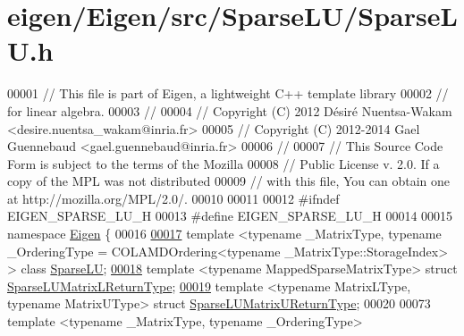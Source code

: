 \hypertarget{eigen_2_eigen_2src_2_sparse_l_u_2_sparse_l_u_8h_source}{}\section{eigen/\+Eigen/src/\+Sparse\+L\+U/\+Sparse\+LU.h}
\label{eigen_2_eigen_2src_2_sparse_l_u_2_sparse_l_u_8h_source}

\begin{DoxyCode}
00001 \textcolor{comment}{// This file is part of Eigen, a lightweight C++ template library}
00002 \textcolor{comment}{// for linear algebra.}
00003 \textcolor{comment}{//}
00004 \textcolor{comment}{// Copyright (C) 2012 Désiré Nuentsa-Wakam <desire.nuentsa\_wakam@inria.fr>}
00005 \textcolor{comment}{// Copyright (C) 2012-2014 Gael Guennebaud <gael.guennebaud@inria.fr>}
00006 \textcolor{comment}{//}
00007 \textcolor{comment}{// This Source Code Form is subject to the terms of the Mozilla}
00008 \textcolor{comment}{// Public License v. 2.0. If a copy of the MPL was not distributed}
00009 \textcolor{comment}{// with this file, You can obtain one at http://mozilla.org/MPL/2.0/.}
00010 
00011 
00012 \textcolor{preprocessor}{#ifndef EIGEN\_SPARSE\_LU\_H}
00013 \textcolor{preprocessor}{#define EIGEN\_SPARSE\_LU\_H}
00014 
00015 \textcolor{keyword}{namespace }\hyperlink{namespace_eigen}{Eigen} \{
00016 
\hyperlink{group___sparse_l_u___module}{00017} \textcolor{keyword}{template} <\textcolor{keyword}{typename} \_MatrixType, \textcolor{keyword}{typename} \_OrderingType = COLAMDOrdering<\textcolor{keyword}{typename} \_MatrixType::StorageIndex>
       > \textcolor{keyword}{class }\hyperlink{group___sparse_l_u___module_class_eigen_1_1_sparse_l_u}{SparseLU};
\hyperlink{struct_eigen_1_1_sparse_l_u_matrix_l_return_type}{00018} \textcolor{keyword}{template} <\textcolor{keyword}{typename} MappedSparseMatrixType> \textcolor{keyword}{struct }\hyperlink{struct_eigen_1_1_sparse_l_u_matrix_l_return_type}{SparseLUMatrixLReturnType};
\hyperlink{struct_eigen_1_1_sparse_l_u_matrix_u_return_type}{00019} \textcolor{keyword}{template} <\textcolor{keyword}{typename} MatrixLType, \textcolor{keyword}{typename} MatrixUType> \textcolor{keyword}{struct }
      \hyperlink{struct_eigen_1_1_sparse_l_u_matrix_u_return_type}{SparseLUMatrixUReturnType};
00020 
00073 \textcolor{keyword}{template} <\textcolor{keyword}{typename} \_MatrixType, \textcolor{keyword}{typename} \_OrderingType>

\end{DoxyCode}
